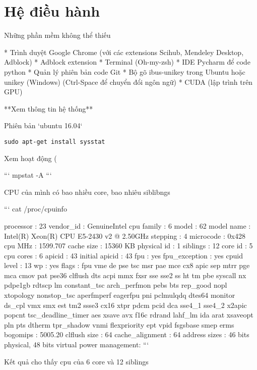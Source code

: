 \chapter{Hệ điều hành}

Những phần mềm không thể thiếu

* Trình duyệt Google Chrome (với các extensions Scihub, Mendeley Desktop, Adblock)
    * Adblock extension
* Terminal (Oh-my-zsh)
* IDE Pycharm để code python
* Quản lý phiên bản code Git
* Bộ gõ ibus-unikey trong Ubuntu hoặc unikey (Windows) (Ctrl-Space để chuyển đổi ngôn ngữ)
* CUDA (lập trình trên GPU)

**Xem thông tin hệ thống**

Phiên bản `ubuntu 16.04`

\begin{lstlisting}
sudo apt-get install sysstat
\end{lstlisting}


Xem hoạt động (%

```
mpstat -A
```

CPU của mình có bao nhiều core, bao nhiêu siblibngs

```
cat /proc/cpuinfo

processor       : 23
vendor_id       : GenuineIntel
cpu family      : 6
model           : 62
model name      : Intel(R) Xeon(R) CPU E5-2430 v2 @ 2.50GHz
stepping        : 4
microcode       : 0x428
cpu MHz         : 1599.707
cache size      : 15360 KB
physical id     : 1
siblings        : 12
core id         : 5
cpu cores       : 6
apicid          : 43
initial apicid  : 43
fpu             : yes
fpu_exception   : yes
cpuid level     : 13
wp              : yes
flags           : fpu vme de pse tsc msr pae mce cx8 apic sep mtrr pge mca cmov pat pse36 clflush dts acpi mmx fxsr sse sse2 ss ht tm pbe syscall nx pdpe1gb rdtscp lm constant_tsc arch_perfmon pebs bts rep_good nopl xtopology nonstop_tsc aperfmperf eagerfpu pni pclmulqdq dtes64 monitor ds_cpl vmx smx est tm2 ssse3 cx16 xtpr pdcm pcid dca sse4_1 sse4_2 x2apic popcnt tsc_deadline_timer aes xsave avx f16c rdrand lahf_lm ida arat xsaveopt pln pts dtherm tpr_shadow vnmi flexpriority ept vpid fsgsbase smep erms
bogomips        : 5005.20
clflush size    : 64
cache_alignment : 64
address sizes   : 46 bits physical, 48 bits virtual
power management:
```

Kết quả cho thấy cpu của 6 core và 12 siblings